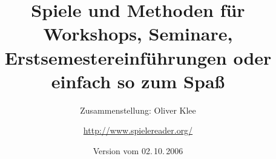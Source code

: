 \documentclass[a4paper,twoside,11pt,titlepage,openany]{scrbook}
\author{\raggedright Zusammenstellung: Oliver Klee \and \url{http://www.spielereader.org/}}
\title{Spiele und Methoden für Workshops, Seminare, Erstsemestereinführungen oder einfach so zum Spaß}
\date{Version vom 02.\,10.\,2006}
\begin{document}
\nocite*{}

\frontmatter
\maketitle
\tableofcontents

\mainmatter











\backmatter


\appendix


\printindex
\end{document}
